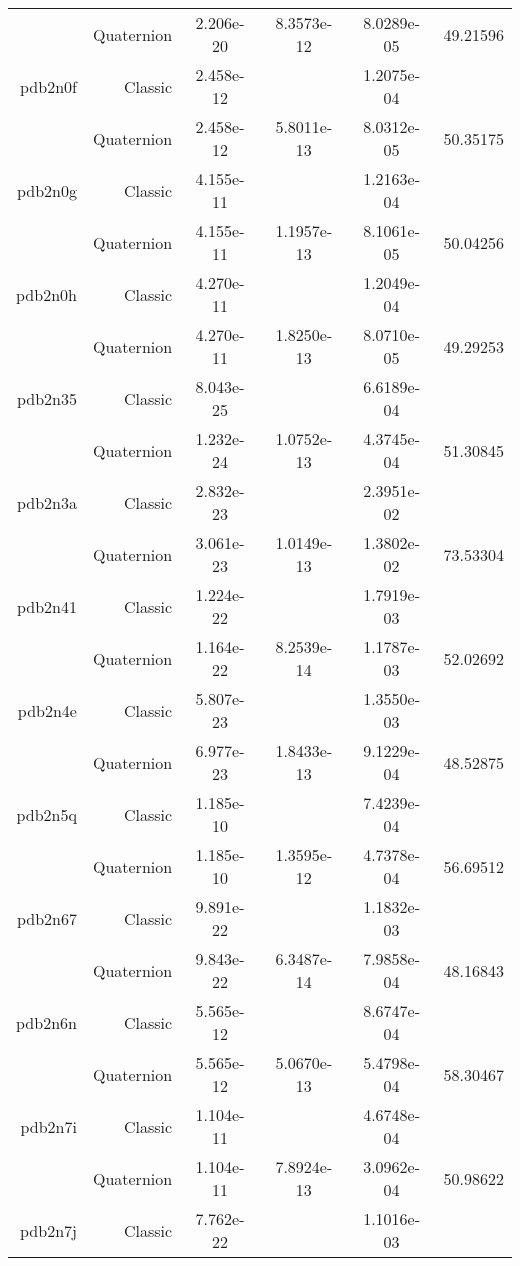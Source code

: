 \begin{xltabular}{\textwidth}{r|rS[table-format=1.3e+2]S[table-format=1.4e+2]S[table-format=1.4e+2]S[table-format=-1.5]}
& Quaternion & 2.206e-20 & 8.3573e-12 & 8.0289e-05 & 49.21596\\  \addlinespace
pdb2n0f & Classic & 2.458e-12 &  & 1.2075e-04 & \\
& Quaternion & 2.458e-12 & 5.8011e-13 & 8.0312e-05 & 50.35175\\  \addlinespace
pdb2n0g & Classic & 4.155e-11 &  & 1.2163e-04 & \\
& Quaternion & 4.155e-11 & 1.1957e-13 & 8.1061e-05 & 50.04256\\  \addlinespace
pdb2n0h & Classic & 4.270e-11 &  & 1.2049e-04 & \\
& Quaternion & 4.270e-11 & 1.8250e-13 & 8.0710e-05 & 49.29253\\  \addlinespace
pdb2n35 & Classic & 8.043e-25 &  & 6.6189e-04 & \\
& Quaternion & 1.232e-24 & 1.0752e-13 & 4.3745e-04 & 51.30845\\  \addlinespace
pdb2n3a & Classic & 2.832e-23 &  & 2.3951e-02 & \\
& Quaternion & 3.061e-23 & 1.0149e-13 & 1.3802e-02 & 73.53304\\  \addlinespace
pdb2n41 & Classic & 1.224e-22 &  & 1.7919e-03 & \\
& Quaternion & 1.164e-22 & 8.2539e-14 & 1.1787e-03 & 52.02692\\  \addlinespace
pdb2n4e & Classic & 5.807e-23 &  & 1.3550e-03 & \\
& Quaternion & 6.977e-23 & 1.8433e-13 & 9.1229e-04 & 48.52875\\  \addlinespace
pdb2n5q & Classic & 1.185e-10 &  & 7.4239e-04 & \\
& Quaternion & 1.185e-10 & 1.3595e-12 & 4.7378e-04 & 56.69512\\  \addlinespace
pdb2n67 & Classic & 9.891e-22 &  & 1.1832e-03 & \\
& Quaternion & 9.843e-22 & 6.3487e-14 & 7.9858e-04 & 48.16843\\  \addlinespace
pdb2n6n & Classic & 5.565e-12 &  & 8.6747e-04 & \\
& Quaternion & 5.565e-12 & 5.0670e-13 & 5.4798e-04 & 58.30467\\  \addlinespace
pdb2n7i & Classic & 1.104e-11 &  & 4.6748e-04 & \\
& Quaternion & 1.104e-11 & 7.8924e-13 & 3.0962e-04 & 50.98622\\  \addlinespace
pdb2n7j & Classic & 7.762e-22 &  & 1.1016e-03 & \\

\end{xltabular}
